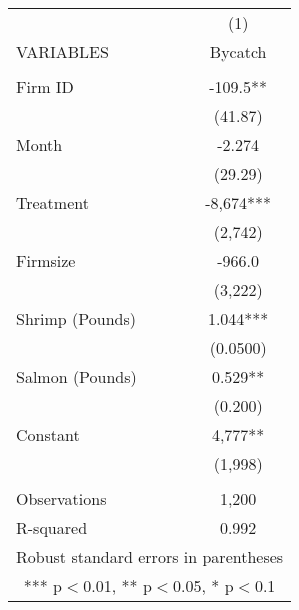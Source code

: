 \begin{tabular}{lc} \hline
 & (1) \\
VARIABLES & Bycatch \\ \hline
 &  \\
Firm ID & -109.5** \\
 & (41.87) \\
Month & -2.274 \\
 & (29.29) \\
Treatment & -8,674*** \\
 & (2,742) \\
Firmsize & -966.0 \\
 & (3,222) \\
Shrimp (Pounds) & 1.044*** \\
 & (0.0500) \\
Salmon (Pounds) & 0.529** \\
 & (0.200) \\
Constant & 4,777** \\
 & (1,998) \\
 &  \\
Observations & 1,200 \\
 R-squared & 0.992 \\ \hline
\multicolumn{2}{c}{ Robust standard errors in parentheses} \\
\multicolumn{2}{c}{ *** p$<$0.01, ** p$<$0.05, * p$<$0.1} \\
\end{tabular}
